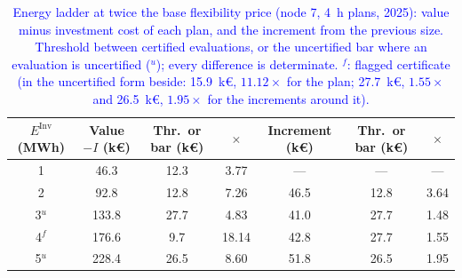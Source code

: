 \begin{table}[htbp!]
    \centering
    \caption{\textcolor{blue}{Energy ladder at twice the base flexibility price (node 7, 4~h plans, 2025): value minus investment cost of each plan, and the increment from the previous size. Threshold between certified evaluations, or the uncertified bar where an evaluation is uncertified ($^{u}$); every difference is determinate. $^{f}$: flagged certificate (in the uncertified form beside: 15.9~k\euro, $11.12\times$ for the plan; 27.7~k\euro, $1.55\times$ and 26.5~k\euro, $1.95\times$ for the increments around it).}}
    \label{tab:res_energy_ladder_m2}
    \scriptsize\setlength{\tabcolsep}{4pt}
    \begin{tabular}{c c c c c c c}
        \toprule
        $E^{\text{Inv}}$ (MWh) & Value $- I$ (k\euro) & Thr.\ or bar (k\euro) & $\times$ & Increment (k\euro) & Thr.\ or bar (k\euro) & $\times$ \\
        \midrule
        1         & 46.3  & 12.3 & 3.77  & ---  & ---  & ---  \\
        2         & 92.8  & 12.8 & 7.26  & 46.5 & 12.8 & 3.64 \\
        3$^{u}$   & 133.8 & 27.7 & 4.83  & 41.0 & 27.7 & 1.48 \\
        4$^{f}$   & 176.6 & 9.7  & 18.14 & 42.8 & 27.7 & 1.55 \\
        5$^{u}$   & 228.4 & 26.5 & 8.60  & 51.8 & 26.5 & 1.95 \\
        \bottomrule
    \end{tabular}
\end{table}

